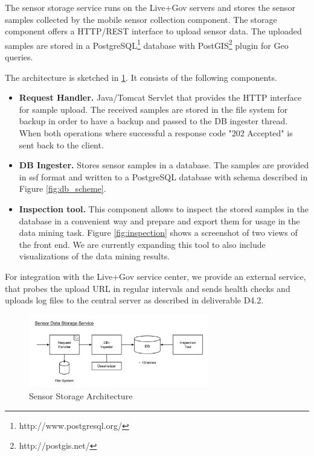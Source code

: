 The sensor storage service runs on the Live+Gov servers and stores the
sensor samples collected by the mobile sensor collection component.
The storage component offers a HTTP/REST interface to upload sensor
data.  The uploaded samples are stored in a
PostgreSQL\footnote{http://www.postgresql.org/} database with
PostGIS\footnote{http://postgis.net/} plugin for Geo queries.

The architecture is sketched in \ref{fig:ss_architecture}. It consists
of the following components.
\begin{itemize}
\item {\bf Request Handler.} Java/Tomcat Servlet that provides the
  HTTP interface for sample upload. The received samples are stored in
  the file system for backup in order to have a backup and passed to
  the DB ingester thread. When both operations where successful a
  response code "202 Accepted" is sent back to the client.
\item {\bf DB Ingester.} Stores sensor samples in a database. 
  The samples are provided in ssf format and written to a PostgreSQL
  database with schema described in Figure \ref{fig:db_scheme}.
\item {\bf Inspection tool.} This component allows to inspect the
  stored samples in the database in a convenient way and prepare and
  export them for usage in the data mining task. Figure
  \ref{fig:inspection} shows a screenshot of two views of the front
  end. We are currently expanding this tool to also include
  visualizations of the data mining results.
\end{itemize}

For integration with the Live+Gov service center, we provide an
external service, that probes the upload URL in regular intervals and
sends health checks and uploads log files to the central server as
described in deliverable D4.2.

\begin{figure}
\centering
\includegraphics[width=0.7\textwidth]{img/sc/ss_architecture.png}
\caption{Sensor Storage Architecture}\label{fig:ss_architecture}
\end{figure}

